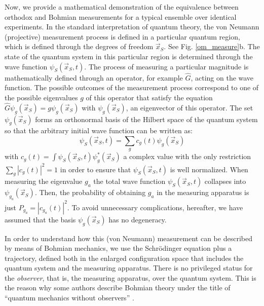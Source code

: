 \documentclass[nofootinbib, secnumarabic, amsmath, nobibnotes,10pt,aps,pra]{revtex4-1}
\newcommand{\fref}[1]{Fig. \ref{#1}}
\begin{document}
Now, we provide a mathematical demonstration of the equivalence between orthodox and Bohmian measurements for a typical ensemble over identical experiments. In the standard interpretation of quantum theory, the von
Neumann (projective) measurement process is defined in a particular
quantum region, which is defined through the degrees of freedom
$\vec x_S$. See \fref{om_measure}b. The state of the quantum system
in this particular region is determined through the wave function
$\psi_S(\vec x_S,t)$. The process of measuring a particular
magnitude is mathematically defined through an operator, for
example $\hat{G}$, acting on the wave function. The possible
outcomes of the measurement process correspond to one of the
possible eigenvalues $g$ of this operator that satisfy the equation
$\hat{G}\psi_g(\vec x_S) = g\psi_g(\vec x_S)$ with $\psi_g(\vec
x_S)$, an eigenvector of this operator. The set $\psi_g(\vec x_S)$
forms an orthonormal basis of the Hilbert space of the quantum
system so that the arbitrary initial wave function can be written
as:\enlargethispage{1pc}
\begin{equation}
\label{om.bmeasure1}
\psi_S(\vec x_S,t) = \sum_{g} c_g(t)\psi_g(\vec x_S)
\end{equation}
with $c_g(t)=\int \psi_S(\vec x_S,t)\psi_g^*(\vec x_S) $ a complex value with the only restriction $\sum_{g}
|c_g(t)|^2 = 1$ in order to ensure that $\psi_S(\vec x_S,t)$ is well
normalized. When measuring the eigenvalue $g_a$ the total wave
function $\psi_S(\vec x_S,t)$ collapses into $\psi_{g_a}(\vec x_S)$.
Then, the probability of obtaining $g_a$ in the measuring apparatus
is just $P_{g_a} = |c_{g_a}(t)|^2$. To avoid unnecessary
complications, hereafter, we have assumed that the basis $\psi_g(\vec x_S)$ has no
degeneracy.

In order to understand how this (von Neumann) measurement can be
described by means of Bohmian mechanics, we use the Schr\"odinger
equation plus a trajectory, defined both in the enlarged
configuration space that includes the quantum system and the
measuring apparatus. There is no privileged status for the
\emph{observer}, that is, the measuring apparatus, over the quantum
system. This is the reason why some authors describe Bohmian theory
under the title of ``quantum mechanics without observers''
\cite{om.Goldsteinobserver}.
\end{document}

